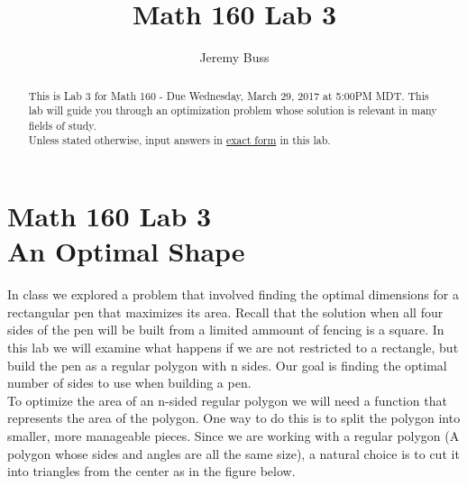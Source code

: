 \documentclass[handout,nooutcomes]{ximera}
\title{Math 160 Lab 3}
\author{Jeremy Buss} %
\begin{document}
\section{Math 160 Lab 3 \\ An Optimal Shape}

\begin{abstract}
This is Lab 3 for Math 160 - Due Wednesday, March 29, 2017 at 5:00PM MDT.
This lab will guide you through an optimization problem whose solution is relevant in many fields of study.\\

Unless stated otherwise, input answers in \underline{exact form} in this lab.
\end{abstract}

\maketitle

\hspace{2cm}In class we explored a problem that involved finding the optimal dimensions for a rectangular pen that maximizes its area. Recall that the solution when all four sides of the pen will be built from a limited ammount of fencing is a square. In this lab we will examine what happens if we are not restricted to a rectangle, but build the pen as a regular polygon with n sides. Our goal is finding the optimal number of sides to use when building a pen.\\

\medskip
\hspace{2cm}To optimize the area of an n-sided regular polygon we will need a function that represents the area of the polygon. One way to do this is to split the polygon into smaller, more manageable pieces. Since we are working with a regular polygon (A polygon whose sides and angles are all the same size), a natural choice is to cut it into triangles from the center as in the figure below.

 
\end{document}

